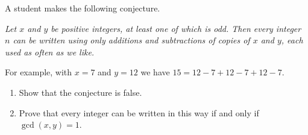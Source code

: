 A student makes the following conjecture.

\emph{Let $x$ and $y$ be positive integers, at least one of which is odd. Then every integer $n$ can be written using only additions and subtractions of copies of $x$ and $y$, each used as often as we like.}

For example, with $x=7$ and $y=12$ we have $15=12-7+12-7+12-7$.
\begin{enumerate}
\item[(a)] Show that the conjecture is false.
\item[(b)] Prove that every integer can be written in this way if and only if $\gcd(x,y)=1$.
\end{enumerate}
